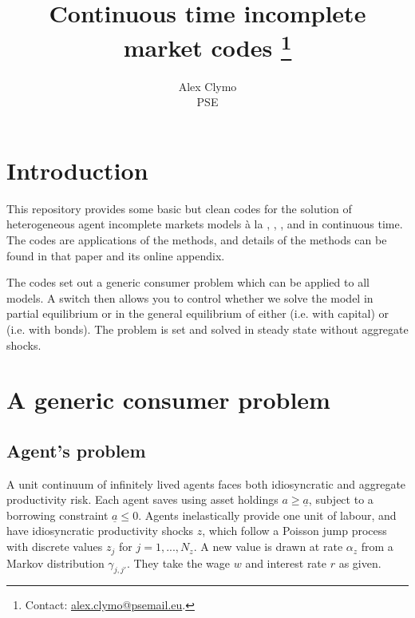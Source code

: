 \documentclass[11pt,english]{article}
\title{Continuous time incomplete market codes \thanks{\noindent \hspace*{-2em} %
Contact: \url{alex.clymo@psemail.eu}. 
}}
\author{Alex Clymo \\ PSE}
\begin{document}
\maketitle



\onehalfspacing

\vspace{-1cm}

\section{Introduction} 
\label{sec:introduction} 

This repository provides some basic but clean codes for the solution of heterogeneous agent incomplete markets models à la \cite{BewleyStationary1986}, \cite{ImrohorogluCost1989}, \cite{HuggettRiskfree1993}, and \cite{AiyagariUninsured1994} in continuous time. The codes are applications of the \cite{AchdouEtAlIncome2022} methods, and details of the methods can be found in that paper and its online appendix. 

The codes set out a generic consumer problem which can be applied to all models. A switch then allows you to control whether we solve the model in partial equilibrium or in the general equilibrium of either \cite{AiyagariUninsured1994} (i.e. with capital) or \cite{HuggettRiskfree1993} (i.e. with bonds). The problem is set and solved in steady state without aggregate shocks. 


\section{A generic consumer problem}

\subsection{Agent's problem}

A unit continuum of infinitely lived agents faces both idiosyncratic and aggregate productivity risk. Each agent saves using asset holdings \( a \geq \underline{a} \), subject to a borrowing constraint $\underline{a} \leq 0$. Agents inelastically provide one unit of labour, and have idiosyncratic productivity shocks \( z \), which follow a Poisson jump process with discrete values $z_j$ for $j=1,...,N_z$. A new value is drawn at rate $\alpha_z$ from a Markov distribution $\gamma_{j,j'}$. They take the wage $w$ and interest rate $r$ as given. 
\end{document}
